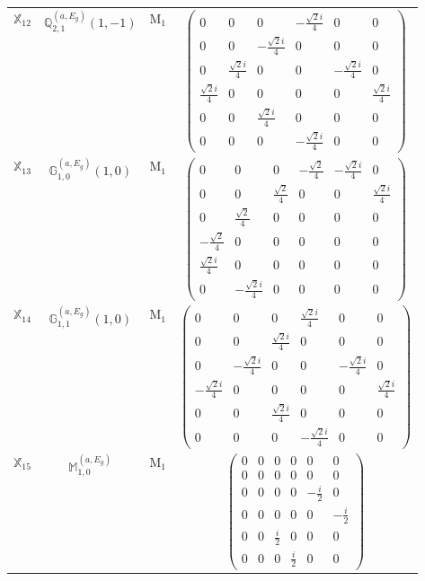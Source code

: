 \documentclass[fleqn,10pt,landscape]{article}
\begin{document}
\begin{itemize}
\begin{center}
\begin{longtable}{c|c|c|c}
$ \mathbb{X}_{12} $ & $\mathbb{Q}_{2,1}^{(a,E_{g})}(1,-1)$ & M$_{1}$ & $\begin{pmatrix} 0 & 0 & 0 & - \frac{\sqrt{2} i}{4} & 0 & 0 \\ 0 & 0 & - \frac{\sqrt{2} i}{4} & 0 & 0 & 0 \\ 0 & \frac{\sqrt{2} i}{4} & 0 & 0 & - \frac{\sqrt{2} i}{4} & 0 \\ \frac{\sqrt{2} i}{4} & 0 & 0 & 0 & 0 & \frac{\sqrt{2} i}{4} \\ 0 & 0 & \frac{\sqrt{2} i}{4} & 0 & 0 & 0 \\ 0 & 0 & 0 & - \frac{\sqrt{2} i}{4} & 0 & 0 \end{pmatrix}$ \\
$ \mathbb{X}_{13} $ & $\mathbb{G}_{1,0}^{(a,E_{g})}(1,0)$ & M$_{1}$ & $\begin{pmatrix} 0 & 0 & 0 & - \frac{\sqrt{2}}{4} & - \frac{\sqrt{2} i}{4} & 0 \\ 0 & 0 & \frac{\sqrt{2}}{4} & 0 & 0 & \frac{\sqrt{2} i}{4} \\ 0 & \frac{\sqrt{2}}{4} & 0 & 0 & 0 & 0 \\ - \frac{\sqrt{2}}{4} & 0 & 0 & 0 & 0 & 0 \\ \frac{\sqrt{2} i}{4} & 0 & 0 & 0 & 0 & 0 \\ 0 & - \frac{\sqrt{2} i}{4} & 0 & 0 & 0 & 0 \end{pmatrix}$ \\
$ \mathbb{X}_{14} $ & $\mathbb{G}_{1,1}^{(a,E_{g})}(1,0)$ & M$_{1}$ & $\begin{pmatrix} 0 & 0 & 0 & \frac{\sqrt{2} i}{4} & 0 & 0 \\ 0 & 0 & \frac{\sqrt{2} i}{4} & 0 & 0 & 0 \\ 0 & - \frac{\sqrt{2} i}{4} & 0 & 0 & - \frac{\sqrt{2} i}{4} & 0 \\ - \frac{\sqrt{2} i}{4} & 0 & 0 & 0 & 0 & \frac{\sqrt{2} i}{4} \\ 0 & 0 & \frac{\sqrt{2} i}{4} & 0 & 0 & 0 \\ 0 & 0 & 0 & - \frac{\sqrt{2} i}{4} & 0 & 0 \end{pmatrix}$ \\
$ \mathbb{X}_{15} $ & $\mathbb{M}_{1,0}^{(a,E_{g})}$ & M$_{1}$ & $\begin{pmatrix} 0 & 0 & 0 & 0 & 0 & 0 \\ 0 & 0 & 0 & 0 & 0 & 0 \\ 0 & 0 & 0 & 0 & - \frac{i}{2} & 0 \\ 0 & 0 & 0 & 0 & 0 & - \frac{i}{2} \\ 0 & 0 & \frac{i}{2} & 0 & 0 & 0 \\ 0 & 0 & 0 & \frac{i}{2} & 0 & 0 \end{pmatrix}$ \\

\end{longtable}
\end{center}
\end{itemize}
\end{document}
